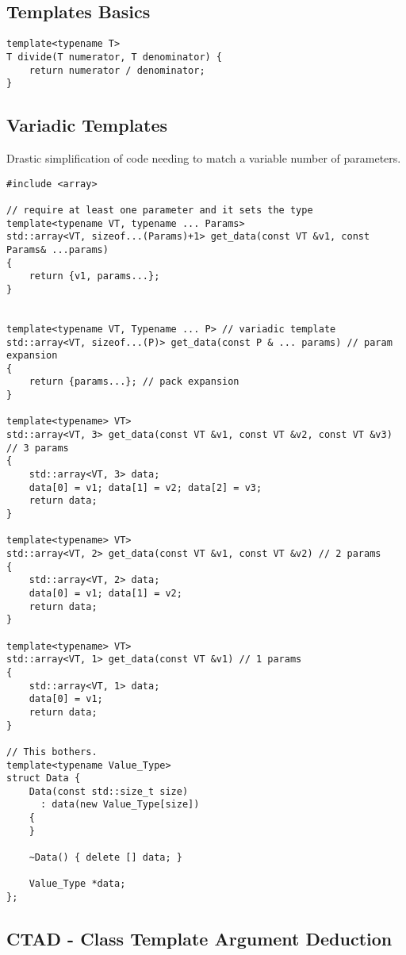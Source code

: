 \documentclass[openany]{report}
\begin{document}
\subsection{Templates Basics}

\begin{verbatim}
template<typename T>
T divide(T numerator, T denominator) {
    return numerator / denominator;
}
\end{verbatim}

\subsection{Variadic Templates}

Drastic simplification of code needing to match a variable number of parameters.

\begin{verbatim}
#include <array>

// require at least one parameter and it sets the type
template<typename VT, typename ... Params>
std::array<VT, sizeof...(Params)+1> get_data(const VT &v1, const Params& ...params)
{
    return {v1, params...};
}


template<typename VT, Typename ... P> // variadic template
std::array<VT, sizeof...(P)> get_data(const P & ... params) // param expansion
{
    return {params...}; // pack expansion
}

template<typename> VT>
std::array<VT, 3> get_data(const VT &v1, const VT &v2, const VT &v3) // 3 params
{
    std::array<VT, 3> data;
    data[0] = v1; data[1] = v2; data[2] = v3;
    return data;
}

template<typename> VT>
std::array<VT, 2> get_data(const VT &v1, const VT &v2) // 2 params
{
    std::array<VT, 2> data;
    data[0] = v1; data[1] = v2;
    return data;
}

template<typename> VT>
std::array<VT, 1> get_data(const VT &v1) // 1 params
{
    std::array<VT, 1> data;
    data[0] = v1;
    return data;
}

// This bothers.
template<typename Value_Type>
struct Data {
    Data(const std::size_t size)
      : data(new Value_Type[size])
    {
    }

    ~Data() { delete [] data; }

    Value_Type *data;
};
\end{verbatim}

\subsection{CTAD - Class Template Argument Deduction}
\end{document}
